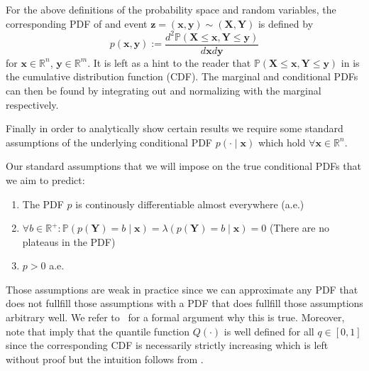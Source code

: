 For the above definitions of the probability space and random variables, the corresponding PDF of and event $\mathbf{z} = (\mathbf{x}, \mathbf{y}) \sim (\mathbf{X}, \mathbf{Y})$ is defined by
\begin{equation}\label{eq:pdf}
    p(\mathbf{x}, \mathbf{y}):=\frac{d^2 \mathbb{P}(\mathbf{X} \leq
        \mathbf{x}, \mathbf{Y} \leq \mathbf{y})}{d \mathbf{x} d \mathbf{y}}
\end{equation}
for $\mathbf{x} \in \mathbb{R}^n$, $\mathbf{y}\in\mathbb{R}^m$. It is left as a hint to the reader that $\mathbb{P}(\mathbf{X} \leq
    \mathbf{x}, \mathbf{Y} \leq \mathbf{y})$ in  is the cumulative distribution function (CDF). The marginal and conditional PDFs can then be found by integrating out and normalizing with the marginal respectively.

Finally in order to analytically show certain results we require some standard assumptions of the underlying conditional PDF $p(\cdot\mid \mathbf{x})$ which hold $\forall \mathbf{x}\in \mathbb{R}^n$.

\begin{definition}\label{def:assumptions} %
    Our standard assumptions that we will impose on the true conditional PDFs that we aim to predict:
    \begin{enumerate}

        \item The PDF $p$ is continously differentiable almost everywhere (a.e.)
        \item $\forall b\in\mathbb{R}^+: \mathbb{P}(p(\mathbf{Y}) = b\mid \mathbf{x}) = \lambda(p(\mathbf{Y}) = b \mid \mathbf{x}) = 0$ (There are no plateaus in the PDF)
        \item $p > 0$ a.e.
    \end{enumerate}
\end{definition}

Those assumptions are weak in practice since we can approximate any PDF that does not fullfill those assumptions with a PDF that does fullfill those assumptions arbitrary well. We refer to~\cite{klenke2013probability} for a formal argument why this is true. Moreover, note that  imply that the quantile function $Q(\cdot)$ is well defined for all $q\in[0,1]$ since the corresponding CDF is necessarily strictly increasing which is left without proof but the intuition follows from .

